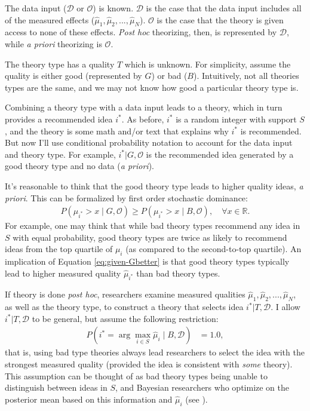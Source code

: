 \documentclass[12pt,english]{article}
\theoremstyle{plain}
\theoremstyle{plain}
\begin{document}
The data input ($\mathcal{D}$ or $\mathcal{O}$) is  known. $\mathcal{D}$ is the case that the data input includes all of the measured effects ($\hat{\mu}_{1},\hat{\mu}_{2},...,\hat{\mu}_{N}$). $\mathcal{O}$ is the case that the theory is given access to none of these effects. \emph{Post hoc} theorizing, then, is represented by $\mathcal{D}$, while \emph{a priori} theorizing is $\mathcal{O}$.

The theory type has a quality $T$ which is unknown. For simplicity, assume the quality is either good (represented by $G$) or bad ($B$). Intuitively, not all theories types are the same, and we may not know how good a particular theory type is.

Combining a theory type with a data input leads to a theory, which in turn provides a recommended idea $i^{\ast}$. As before, $i^\ast$ is a random integer with support $S$, and the theory is some math and/or text that explains why $i^\ast$ is recommended.  But now I'll use conditional probability notation to account for the data input and theory type. For example, $i^{\ast}|G,\mathcal{O}$ is the recommended idea generated by a good theory type and no data (\emph{a priori}).

It's reasonable to think that the good theory type leads to higher quality ideas, \emph{a priori}. This can be formalized by first order stochastic dominance:
\begin{align}
P\left(\mu_{i^{\ast}}>x\mid G,\mathcal{O}\right)
\geq
P\left(\mu_{i^{\ast}}>x\mid B,\mathcal{O}\right),
\quad \forall x\in \mathbb{R}.
\label{eq:given-Gbetter}
\end{align}
For example, one may think that while bad theory types recommend any idea in $S$ with equal probability, good theory types are twice as likely to recommend ideas from the top quartile of $\mu_{i}$ (as compared to the second-to-top quartile). An implication of Equation \eqref{eq:given-Gbetter} is that  good theory types typically lead to higher measured quality $\hat{\mu}_{i^{\ast}}$ than bad theory types.

If theory is done \emph{post hoc}, researchers examine measured qualities $\hat{\mu}_1,\hat{\mu}_2,...,\hat{\mu}_N$, as well as the theory type, to construct a theory that selects idea $i^{\ast}|T,\mathcal{D}$. I allow $i^{\ast}|T,\mathcal{D}$ to be general, but assume the following restriction:
\begin{align}
P\left(i^{\ast}=\arg\max_{i\in S }\hat{\mu}_{i}\mid B,\mathcal{D}\right) & =1.0,
\label{eq:endo:bad-post-hoc}
\end{align}
that is, using bad type theories always lead researchers to select the idea with the strongest measured quality (provided the idea is consistent with \emph{some} theory).  This assumption can be thought of as bad theory types being unable to distinguish between ideas in $S$, and Bayesian researchers who optimize on the posterior mean based on this information and $\hat{\mu}_{i}$ (see \citealt{chen2025high}). 
\end{document}
